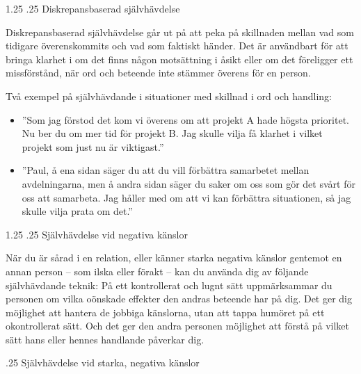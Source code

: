 \documentclass[swedish,a4paper]{book}
\makeatletter
\renewcommand\section{\@startsection{section}{1}{\z@}%
                                   {1.25\baselineskip}%
                                   {.25\baselineskip}%
                                   {\fontsize{1.25\baselineskip}{1.25\baselineskip}\selectfont\sffamily\bfseries}} %
\renewcommand\subsection{\@startsection{subsection}{1}{\z@}%
                                   {\baselineskip}%
                                   {.25\baselineskip}%
                                   {\fontsize{1\baselineskip}{1.25\baselineskip}\selectfont\sffamily\bfseries}} %
\makeatother
\begin{document}
\section{Diskrepansbaserad självhävdelse}

Diskrepansbaserad självhävdelse går ut på att peka på skillnaden mellan vad som tidigare överenskommits och vad som faktiskt händer. Det är användbart för att bringa klarhet i om det finns någon motsättning i åsikt eller om det föreligger ett missförstånd, när ord och beteende inte stämmer överens för en person.

Två exempel på självhävdande i situationer med skillnad i ord och handling:

\begin{itemize}

\item ''Som jag förstod det kom vi överens om att projekt A hade högsta prioritet. Nu ber du om mer tid för projekt B. Jag skulle vilja få klarhet i vilket projekt som just nu är viktigast.''

\item ''Paul, å ena sidan säger du att du vill förbättra samarbetet mellan avdelningarna, men å andra sidan säger du saker om oss som gör det svårt för oss att samarbeta. Jag håller med om att vi kan förbättra situationen, så jag skulle vilja prata om det.''

\end{itemize}

\section{Självhävdelse vid negativa känslor}

När du är sårad i en relation, eller känner starka negativa känslor gentemot en annan person -- som ilska eller förakt -- kan du använda dig av följande självhävdande teknik: På ett kontrollerat och lugnt sätt uppmärksammar du personen om vilka oönskade effekter den andras beteende har på dig. Det ger dig möjlighet att hantera de jobbiga känslorna, utan att tappa humöret på ett okontrollerat sätt. Och det ger den andra personen möjlighet att förstå på vilket sätt hans eller hennes handlande påverkar dig.

\subsection{Självhävdelse vid starka, negativa känslor}
\end{document}
